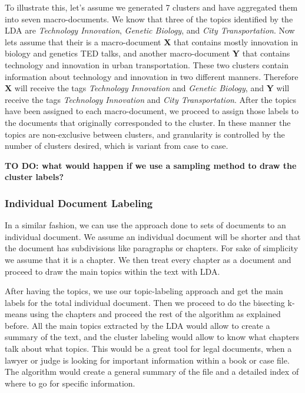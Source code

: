 \documentclass[letterpaper, 11pt]{article}
\begin{document}
To illustrate this, let's assume we generated 7 clusters and have aggregated them into seven macro-documents. We know that three of the topics identified by the LDA are \textit{Technology Innovation}, \textit{Genetic Biology}, and \textit{City Transportation}. Now lets assume that their is a macro-document \textbf{X} that contains mostly innovation in biology and genetics TED talks, and another macro-document \textbf{Y} that contains technology and innovation in urban transportation. These two clusters contain information about technology and innovation in two different manners. Therefore \textbf{X} will receive the tags \textit{Technology Innovation} and \textit{Genetic Biology}, and \textbf{Y} will receive the tags \textit{Technology Innovation} and \textit{City Transportation}. After the topics have been assigned to each macro-document, we proceed to assign those labels to the documents that originally corresponded to the cluster. In these manner the topics are non-exclusive between clusters, and granularity is controlled by the number of clusters desired, which is variant from case to case.

\textbf{TO DO: what would happen if we use a sampling method to draw the cluster labels?}

\subsubsection{Individual Document Labeling}\label{individual-document}

In a similar fashion, we can use the approach done to sets of documents to an individual document. We assume an individual document will be shorter and that the document has subdivisions like paragraphs or chapters. For sake of simplicity we assume that it is a chapter. We then treat every chapter as a document and proceed to draw the main topics within the text with LDA.

After having the topics, we use our topic-labeling approach and get the main labels for the total individual document. Then we proceed to do the bisecting k-means using the chapters and proceed the rest of the algorithm as explained before. All the main topics extracted by the LDA would allow to create a summary of the text, and the cluster labeling would allow to know what chapters talk about what topics. This would be a great tool for legal documents, when a lawyer or judge is looking for important information within a book or case file. The algorithm would create a general summary of the file and a detailed index of where to go for specific information.
\end{document}
